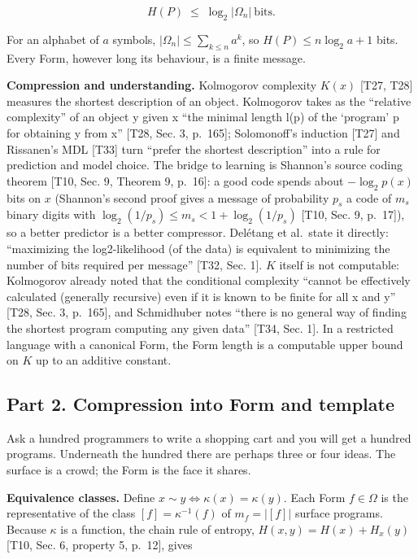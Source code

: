 \documentclass[10pt,letterpaper]{article}
\begin{document}
\[
H(P)\;\le\;\log_2\lvert\Omega_n\rvert\ \text{bits}.
\]

For an alphabet of \(a\) symbols,
\(\lvert\Omega_n\rvert\le\sum_{k\le n}a^k\), so \(H(P)\le n\log_2 a+1\)
bits. Every Form, however long its behaviour, is a finite message.

\textbf{Compression and understanding.} Kolmogorov complexity \(K(x)\)
{[}T27, T28{]} measures the shortest description of an object.
Kolmogorov takes as the ``relative complexity'' of an object y given x
``the minimal length l(p) of the `program' p for obtaining y from x''
{[}T28, Sec. 3, p.~165{]}; Solomonoff's induction {[}T27{]} and
Rissanen's MDL {[}T33{]} turn ``prefer the shortest description'' into a
rule for prediction and model choice. The bridge to learning is
Shannon's source coding theorem {[}T10, Sec. 9, Theorem 9, p.~16{]}: a
good code spends about \(-\log_2 p(x)\) bits on \(x\) (Shannon's second
proof gives a message of probability \(p_s\) a code of \(m_s\) binary
digits with \(\log_2(1/p_s)\le m_s<1+\log_2(1/p_s)\) {[}T10, Sec. 9,
p.~17{]}), so a better predictor is a better compressor. Delétang et
al.~state it directly: ``maximizing the log2-likelihood (of the data) is
equivalent to minimizing the number of bits required per message''
{[}T32, Sec. 1{]}. \(K\) itself is not computable: Kolmogorov already
noted that the conditional complexity ``cannot be effectively calculated
(generally recursive) even if it is known to be finite for all x and y''
{[}T28, Sec. 3, p.~165{]}, and Schmidhuber notes ``there is no general
way of finding the shortest program computing any given data'' {[}T34,
Sec. 1{]}. In a restricted language with a canonical Form, the Form
length is a computable upper bound on \(K\) up to an additive constant.

\subsection{Part 2. Compression into Form and
template}\label{part-2.-compression-into-form-and-template}

Ask a hundred programmers to write a shopping cart and you will get a
hundred programs. Underneath the hundred there are perhaps three or four
ideas. The surface is a crowd; the Form is the face it shares.

\textbf{Equivalence classes.} Define
\(x\sim y \iff \kappa(x)=\kappa(y)\). Each Form \(f\in\Omega\) is the
representative of the class \([f]=\kappa^{-1}(f)\) of
\(m_f=\lvert[f]\rvert\) surface programs. Because \(\kappa\) is a
function, the chain rule of entropy, \(H(x,y)=H(x)+H_x(y)\) {[}T10, Sec.
6, property 5, p.~12{]}, gives
\end{document}
